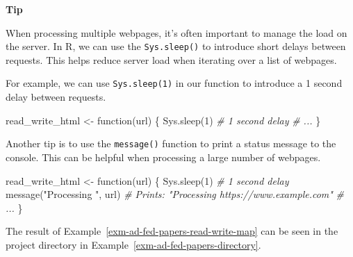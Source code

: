 \documentclass[
  letterpaper,
  DIV=11,
  numbers=noendperiod]{scrreport}
\newenvironment{Shaded}{\begin{snugshade}}{\end{snugshade}}
\newcommand{\CommentTok}[1]{\textcolor[rgb]{0.00,0.00,0.00}{\textit{#1}}}
\newcommand{\ControlFlowTok}[1]{\textcolor[rgb]{0.00,0.00,0.00}{#1}}
\newcommand{\DecValTok}[1]{\textcolor[rgb]{0.00,0.00,0.00}{#1}}
\newcommand{\FunctionTok}[1]{\textcolor[rgb]{0.00,0.00,0.00}{#1}}
\newcommand{\NormalTok}[1]{\textcolor[rgb]{0.00,0.00,0.00}{#1}}
\newcommand{\OtherTok}[1]{\textcolor[rgb]{0.00,0.00,0.00}{#1}}
\newcommand{\StringTok}[1]{\textcolor[rgb]{0.00,0.00,0.00}{#1}}
\theoremstyle{definition}
\theoremstyle{remark}
\begin{document}
\begin{tcolorbox}[enhanced jigsaw, breakable, rightrule=.15mm, arc=.35mm, left=2mm, opacityback=0, leftrule=.75mm, toprule=.15mm, bottomrule=.15mm, colback=white]

\textbf{ Tip}

When processing multiple webpages, it's often important to manage the
load on the server. In R, we can use the \texttt{Sys.sleep()} to
introduce short delays between requests. This helps reduce server load
when iterating over a list of webpages.

For example, we can use \texttt{Sys.sleep(1)} in our function to
introduce a 1 second delay between requests.

\begin{Shaded}
\begin{Highlighting}[]
\NormalTok{read\_write\_html }\OtherTok{\textless{}{-}} \ControlFlowTok{function}\NormalTok{(url) \{}
  \FunctionTok{Sys.sleep}\NormalTok{(}\DecValTok{1}\NormalTok{) }\CommentTok{\# 1 second delay}
  \CommentTok{\# ...}
\NormalTok{\}}
\end{Highlighting}
\end{Shaded}

Another tip is to use the \texttt{message()} function to print a status
message to the console. This can be helpful when processing a large
number of webpages.

\begin{Shaded}
\begin{Highlighting}[]
\NormalTok{read\_write\_html }\OtherTok{\textless{}{-}} \ControlFlowTok{function}\NormalTok{(url) \{}
  \FunctionTok{Sys.sleep}\NormalTok{(}\DecValTok{1}\NormalTok{) }\CommentTok{\# 1 second delay}
  \FunctionTok{message}\NormalTok{(}\StringTok{"Processing "}\NormalTok{, url) }\CommentTok{\# Prints: "Processing https://www.example.com"}
  \CommentTok{\# ...}
\NormalTok{\}}
\end{Highlighting}
\end{Shaded}

\end{tcolorbox}

The result of Example~\ref{exm-ad-fed-papers-read-write-map} can be seen
in the project directory in Example~\ref{exm-ad-fed-papers-directory}.
\end{document}
